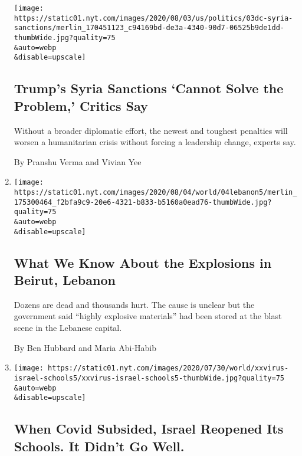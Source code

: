\begin{enumerate}
  \texttt{[image: https://static01.nyt.com/images/2020/08/03/us/politics/03dc-syria-sanctions/merlin\_170451123\_c94169bd-de3a-4340-90d7-06525b9de1dd-thumbWide.jpg?quality=75\\\&auto=webp\\\&disable=upscale]}

  \hypertarget{trumps-syria-sanctions-cannot-solve-the-problem-critics-say}{%
  \subsection{Trump's Syria Sanctions `Cannot Solve the Problem,'
  Critics
  Say}\label{trumps-syria-sanctions-cannot-solve-the-problem-critics-say}}

  Without a broader diplomatic effort, the newest and toughest penalties
  will worsen a humanitarian crisis without forcing a leadership change,
  experts say.

  By Pranshu Verma and Vivian Yee
\item
  \href{/2020/08/04/world/middleeast/beirut-explosion-blast.html}{}

  \texttt{[image: https://static01.nyt.com/images/2020/08/04/world/04lebanon5/merlin\_175300464\_f2bfa9c9-20e6-4321-b833-b5160a0ead76-thumbWide.jpg?quality=75\\\&auto=webp\\\&disable=upscale]}

  \hypertarget{what-we-know-about-the-explosions-in-beirut-lebanon}{%
  \subsection{What We Know About the Explosions in Beirut,
  Lebanon}\label{what-we-know-about-the-explosions-in-beirut-lebanon}}

  Dozens are dead and thousands hurt. The cause is unclear but the
  government said ``highly explosive materials'' had been stored at the
  blast scene in the Lebanese capital.

  By Ben Hubbard and Maria Abi-Habib
\item
  \href{/2020/08/04/world/middleeast/coronavirus-israel-schools-reopen.html}{}

  \texttt{[image: https://static01.nyt.com/images/2020/07/30/world/xxvirus-israel-schools5/xxvirus-israel-schools5-thumbWide.jpg?quality=75\\\&auto=webp\\\&disable=upscale]}

  \hypertarget{when-covid-subsided-israel-reopened-its-schools-it-didnt-go-well}{%
  \subsection{When Covid Subsided, Israel Reopened Its Schools. It
  Didn't Go
  Well.}\label{when-covid-subsided-israel-reopened-its-schools-it-didnt-go-well}}


\end{enumerate}
